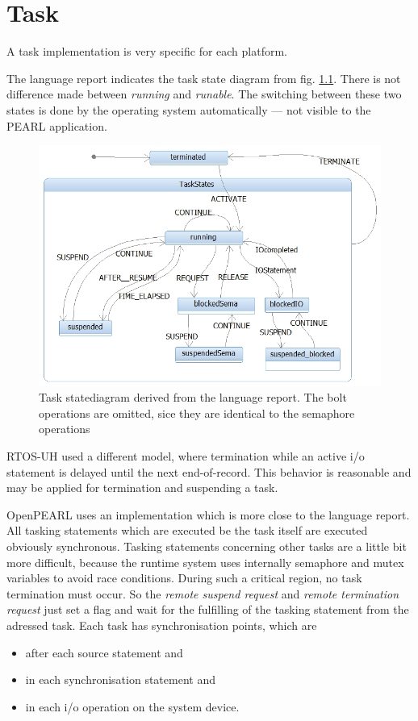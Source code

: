 \chapter{Task}
\label{task}
A task implementation is very specific for each platform.

The language report indicates the task state diagram from 
fig. \ref{taskStatesPEARL90}. There is not difference made between {\em running} and {\em runable}. The switching between these two states is done by the
operating system automatically --- not visible to the PEARL application.

\begin{figure}[bpht]
\includegraphics[width=14cm]{taskStatesPEARL.jpg}
\caption{Task statediagram derived from the language report.
The bolt operations are omitted, sice they are identical to the
semaphore operations}
\label{taskStatesPEARL90}
\end{figure}


RTOS-UH used a different model, where termination while an active i/o statement
is delayed until the next end-of-record. 
This behavior is reasonable and may be applied for termination and
suspending a task. 

OpenPEARL uses an implementation which is more close to the language report.
All tasking statements which are executed be the task itself are executed 
obviously synchronous. Tasking statements concerning other tasks are a little 
bit more difficult, because the runtime system uses internally semaphore
 and mutex
variables to avoid race conditions. During such a critical region,
no task termination must occur. So the  {\em remote suspend request} and 
{\em remote termination request} just set a flag and wait for the fulfilling
 of the 
tasking statement from the adressed task. Each task has synchronisation points,
which are
\begin{itemize}
\item  after each source statement and
\item  in each synchronisation statement and 
\item in each i/o operation on the system device.
\end{itemize}

